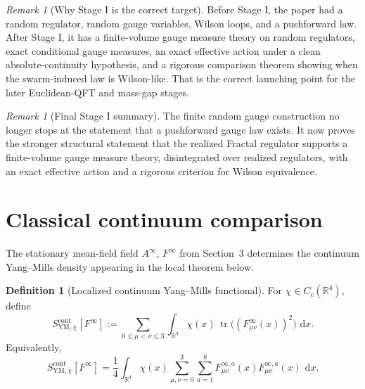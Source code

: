 \documentclass[11pt]{article}
\theoremstyle{definition}
\newtheorem{definition}[theorem]{Definition}
\theoremstyle{remark}
\newtheorem{remark}[theorem]{Remark}
\newcommand{\R}{\mathbb R}
\newcommand{\dd}{\,\mathrm d}
\newcommand{\tr}{\operatorname{tr}}
\begin{document}
\begin{remark}[Why Stage I is the correct target]
\label{rem:why-stage1-correct}
Before Stage I, the paper had a random regulator, random gauge variables,
Wilson loops, and a pushforward law. After Stage I, it has a finite-volume
gauge measure theory on random regulators, exact conditional gauge measures, an
exact effective action under a clean absolute-continuity hypothesis, and a
rigorous comparison theorem showing when the swarm-induced law is Wilson-like.
That is the correct launching point for the later Euclidean-QFT and mass-gap
stages.
\end{remark}

\begin{remark}[Final Stage I summary]
\label{rem:stage1-final-summary}
The finite random gauge construction no longer stops at the statement that a
pushforward gauge law exists. It now proves the stronger structural statement
that the realized Fractal regulator supports a finite-volume gauge measure
theory, disintegrated over realized regulators, with an exact effective action
and a rigorous criterion for Wilson equivalence.
\end{remark}

\section{Classical continuum comparison}

The stationary mean-field field \(A^\infty\), \(F^\infty\) from Section~3
determines the continuum Yang--Mills density appearing in the local theorem
below.

\begin{definition}[Localized continuum Yang--Mills functional]
\label{def:ym-action}
For \(\chi\in C_c(\R^4)\), define
\[
S_{\mathrm{YM},\chi}^{\mathrm{cont}}[F^\infty]
:=
\sum_{0\le\mu<\nu\le3}\int_{\R^4}
\chi(x)\,\tr\!\bigl((F_{\mu\nu}^\infty(x))^2\bigr)\,\dd x.
\]
Equivalently,
\[
S_{\mathrm{YM},\chi}^{\mathrm{cont}}[F^\infty]
=
\frac14\int_{\R^4}\chi(x)\sum_{\mu,\nu=0}^3\sum_{a=1}^8
F_{\mu\nu}^{\infty,a}(x)F_{\mu\nu}^{\infty,a}(x)\,\dd x.
\]
\end{definition}
\end{document}
